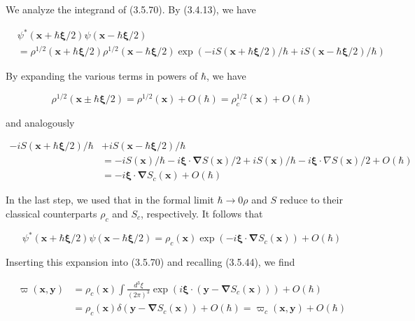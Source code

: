\documentclass{article}
\begin{document}
We analyze the integrand of (3.5.70). By (3.4.13), we have
 
\begin{align*}
& \psi^{*}(\boldsymbol{x}+\hbar \boldsymbol{\xi} / 2) \psi(\boldsymbol{x}-\hbar \boldsymbol{\xi} / 2)  \tag{3.5.71}\\
&=\rho^{1 / 2}(\boldsymbol{x}+\hbar \boldsymbol{\xi} / 2) \rho^{1 / 2}(\boldsymbol{x}-\hbar \boldsymbol{\xi} / 2) \exp (-i S(\boldsymbol{x}+\hbar \boldsymbol{\xi} / 2) / \hbar+i S(\boldsymbol{x}-\hbar \boldsymbol{\xi} / 2) / \hbar)
\end{align*}
 

By expanding the various terms in powers of $\hbar$, we have
 
\begin{equation*}
\rho^{1 / 2}(\boldsymbol{x} \pm \hbar \boldsymbol{\xi} / 2)=\rho^{1 / 2}(\boldsymbol{x})+O(\hbar)=\rho_{c}^{1 / 2}(\boldsymbol{x})+O(\hbar) \tag{3.5.72}
\end{equation*}
 
and analogously
 
\begin{align*}
-i S(\boldsymbol{x}+\hbar \boldsymbol{\xi} / 2) / \hbar & +i S(\boldsymbol{x}-\hbar \boldsymbol{\xi} / 2) / \hbar  \tag{3.5.73}\\
& =-i S(\boldsymbol{x}) / \hbar-i \boldsymbol{\xi} \cdot \boldsymbol{\nabla} S(\boldsymbol{x}) / 2+i S(\boldsymbol{x}) / \hbar-i \boldsymbol{\xi} \cdot \nabla S(\boldsymbol{x}) / 2+O(\hbar) \\
& =-i \boldsymbol{\xi} \cdot \boldsymbol{\nabla} S_{c}(\boldsymbol{x})+O(\hbar)
\end{align*}
 

In the last step, we used that in the formal limit $\hbar \rightarrow 0 \rho$ and $S$ reduce to their classical counterparts $\rho_{c}$ and $S_{c}$, respectively. It follows that
 
\begin{equation*}
\psi^{*}(\boldsymbol{x}+\hbar \boldsymbol{\xi} / 2) \psi(\boldsymbol{x}-\hbar \boldsymbol{\xi} / 2)=\rho_{c}(\boldsymbol{x}) \exp \left(-i \boldsymbol{\xi} \cdot \boldsymbol{\nabla} S_{c}(\boldsymbol{x})\right)+O(\hbar) \tag{3.5.74}
\end{equation*}
 

Inserting this expansion into (3.5.70) and recalling (3.5.44), we find
 
\begin{align*}
\varpi(\boldsymbol{x}, \boldsymbol{y}) & =\rho_{c}(\boldsymbol{x}) \int \frac{d^{3} \xi}{(2 \pi)^{3}} \exp \left(i \boldsymbol{\xi} \cdot\left(\boldsymbol{y}-\boldsymbol{\nabla} S_{c}(\boldsymbol{x})\right)\right)+O(\hbar)  \tag{3.5.75}\\
& =\rho_{c}(\boldsymbol{x}) \delta\left(\boldsymbol{y}-\boldsymbol{\nabla} S_{c}(\boldsymbol{x})\right)+O(\hbar)=\varpi_{c}(\boldsymbol{x}, \boldsymbol{y})+O(\hbar)
\end{align*}
 
\end{document}
